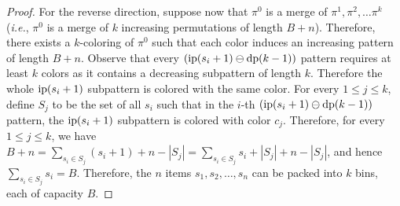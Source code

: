 \begin{proof}
  For the reverse direction, suppose now that 
  $\pi^0$ is a merge of $\pi^1, \pi^2, \dots \pi^k$
  (\emph{i.e.}, $\pi^0$ is a merge of $k$ increasing permutations of length $B+n$).
  Therefore, there exists a $k$-coloring of $\pi^0$ such that each color induces an increasing 
  pattern of length $B+n$.
  Observe that every
  $\left(\operatorname{ip}(s_i+1) \ominus \operatorname{dp}(k-1)\right)$
  pattern requires at least $k$ colors as it contains a decreasing subpattern of
  length $k$.
  Therefore the whole $\operatorname{ip}(s_i+1)$ subpattern is colored with the
  same color.
  For every $1 \leq j \leq k$, define $S_j$ to be the set of all $s_i$ such that
  in the $i$-th
  $\left(\operatorname{ip}(s_i+1) \ominus \operatorname{dp}(k-1)\right)$
  pattern, the $\operatorname{ip}(s_i+1)$ subpattern is colored with color $c_j$.
  Therefore, for every $1 \leq j \leq k$, we have
  $B + n = \sum_{s_i \in S_j} \left(s_i+1\right) + n - |S_j|
  = \sum_{s_i \in S_j} s_i + |S_j| + n - |S_j|$,
  and hence
  $\sum_{s_i \in S_j} s_i = B$.
  Therefore, the $n$ items $s_1, s_2, \dots, s_n$
  can be packed into $k$ bins, each of capacity $B$.
\end{proof}
